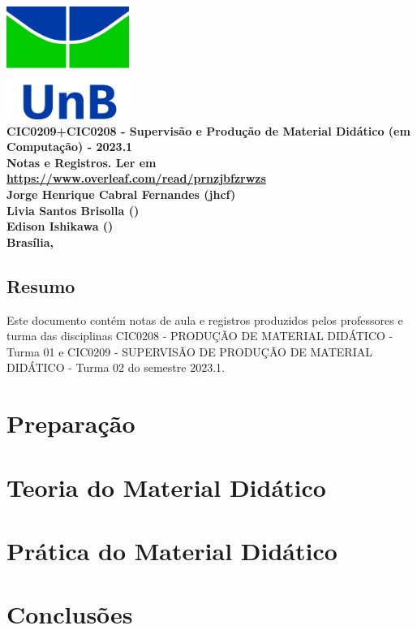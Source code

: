 \documentclass[12pt]{book}
\begin{document}
\clearpage
\thispagestyle{empty}

\begin{titlepage}
\begin{center}
 {\huge\bfseries \includegraphics[width=4cm]{unb-logo.jpg}\\
	CIC0209+CIC0208 - Supervisão e Produção de Material Didático (em Computação) - 2023.1\\
 Notas e Registros.
 Ler em \url{https://www.overleaf.com/read/prnzjbfzrwzs}\\
 \vspace{1.5cm}
{\large	%
	Jorge Henrique Cabral Fernandes (jhcf)\\
    Livia Santos Brisolla ()\\
    Edison Ishikawa ()\\
 }
	\vspace{1.5cm}
	{\large Brasília, \DTMnow }}
\end{center}
\end{titlepage}
    \listoftodos
	\printnoidxglossary
	\tableofcontents
	\listoffigures
	\listoftables
	\clearpage
{}

\pagestyle{fancy}

	\chapter*{Resumo}

	Este documento contém notas de aula e registros  produzidos pelos professores e turma das disciplinas CIC0208 - PRODUÇÃO DE MATERIAL DIDÁTICO - Turma 01	e CIC0209 - SUPERVISÃO DE PRODUÇÃO DE MATERIAL DIDÁTICO - Turma 02 do semestre 2023.1.
	
\part{Preparação\label{part:intro}}

\part{Teoria do Material Didático\label{part:teoria}}


\part{Prática do Material Didático\label{part:pratica}}

\part{Conclusões\label{part:conclusões}}

\label{referencias}
    \printbibliography
\end{document}
